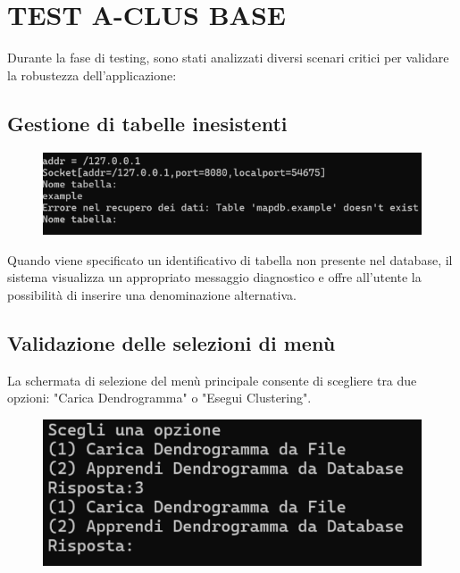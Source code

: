 \section{TEST A-CLUS BASE}

Durante la fase di testing, sono stati analizzati diversi scenari critici per validare la robustezza dell'applicazione:

\subsection{Gestione di tabelle inesistenti}

\begin{figure}[h!]
    \centering
    \includegraphics[width=\textwidth]{images/errore_tabella.png}
\end{figure}

Quando viene specificato un identificativo di tabella non presente nel database, il sistema visualizza un appropriato messaggio diagnostico e offre all'utente la possibilità di inserire una denominazione alternativa.


\subsection{Validazione delle selezioni di menù}

La schermata di selezione del menù principale consente di scegliere tra due opzioni: "Carica Dendrogramma" o "Esegui Clustering".

\begin{figure}[h!]
    \centering
    \includegraphics[width=\textwidth]{images/errore_men.png}
\end{figure}

